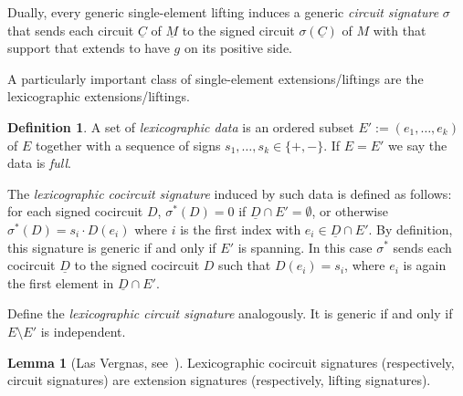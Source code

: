 \documentclass[12pt]{amsart}
\numberwithin{equation}{section}
\theoremstyle{definition}
\newtheorem{lemma}[theorem]{Lemma}
\newtheorem{definition}[theorem]{Definition}
\newtheorem{example}[theorem]{Example}
\newcommand{\paco}[1]{\todo[color=orange!30]{\footnotesize \rm #1 \\ \hfill --- P.}}
\begin{document}
Dually, every generic single-element lifting induces a generic {\em circuit signature} $\sigma$ that sends each circuit $\underline{C}$ of $\underline{M}$ to the signed circuit $\sigma(\underline{C})$ of $M$ with that support that extends to have $g$ on its positive side.

A particularly important class of single-element extensions/liftings are the lexicographic extensions/liftings.

\begin{definition} \label{def:lexi}
A set of {\em lexicographic data} is an ordered subset $E':=(e_1,\ldots,e_k)$ of $E$ together with a sequence of signs $s_1,\ldots,s_k\in\{+,-\}$. If $E=E'$ we say the data is \emph{full}.


The {\em lexicographic cocircuit signature} induced by such data is defined as follows: for each signed cocircuit $D$,  ${\sigma}^*(D)=0$ if $\underline{D}\cap E'=\emptyset$, or otherwise ${\sigma}^*(D)= s_i\cdot D(e_i)$ where $i$ is the first index with $e_i \in\underline{D}\cap E'$.
By definition, this signature is generic if and only if $E'$ is spanning. In this case $\sigma^*$ sends each cocircuit $\underline{D}$ to the signed cocircuit $D$ such that $D(e_i)=s_i$, where $e_i$ is again the first element in $\underline{D}\cap E'$.

Define the {\em lexicographic circuit signature}  analogously. It is generic if and only if $E\setminus E'$ is independent. 
\end{definition}


\begin{lemma}[Las Vergnas, see~]
Lexicographic cocircuit signatures (respectively, circuit signatures) are extension signatures (respectively, lifting signatures).
\end{lemma}



\end{document}
